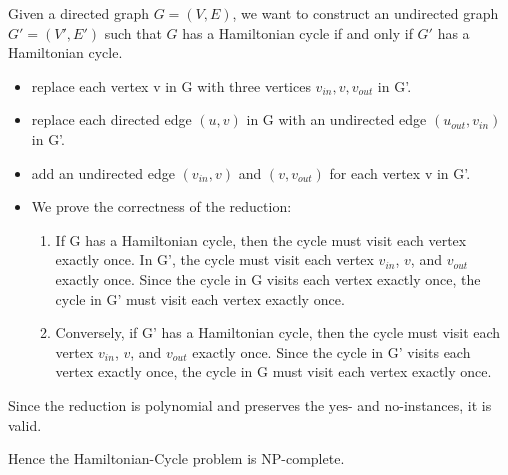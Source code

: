 \begin{solution}
\begin{enumerate}
  Given a directed graph \( G = (V, E) \), we want to construct an undirected graph \( G' = (V', E') \) such that \( G \) has a Hamiltonian cycle if and only if \( G' \) has a Hamiltonian cycle.
  \begin{itemize}
    \item replace each vertex v in G with three vertices \( v_{in}, v, v_{out} \) in G'.
    \item replace each directed edge \( (u, v) \) in G with an undirected edge \( (u_{out}, v_{in}) \) in G'.
    \item add an undirected edge \( (v_{in}, v) \) and \( (v, v_{out}) \) for each vertex v in G'.
    \item We prove the correctness of the reduction:
    \begin{enumerate}
      \item[``\( \Rightarrow \)":] If G has a Hamiltonian cycle, then the cycle must visit each vertex exactly once. In G', the cycle must visit each vertex \( v_{in} \), \( v \), and \( v_{out} \) exactly once. Since the cycle in G visits each vertex exactly once, the cycle in G' must visit each vertex exactly once.
      \item[``\( \Leftarrow \)":] Conversely, if G' has a Hamiltonian cycle, then the cycle must visit each vertex \( v_{in} \), \( v \), and \( v_{out} \) exactly once. Since the cycle in G' visits each vertex exactly once, the cycle in G must visit each vertex exactly once.
    \end{enumerate}

  \end{itemize}
  Since the reduction is polynomial and preserves the \( \text{yes} \)- and \( \text{no} \)-instances, it is valid.

\end{enumerate}
Hence the Hamiltonian-Cycle problem is NP-complete.

\end{solution}


